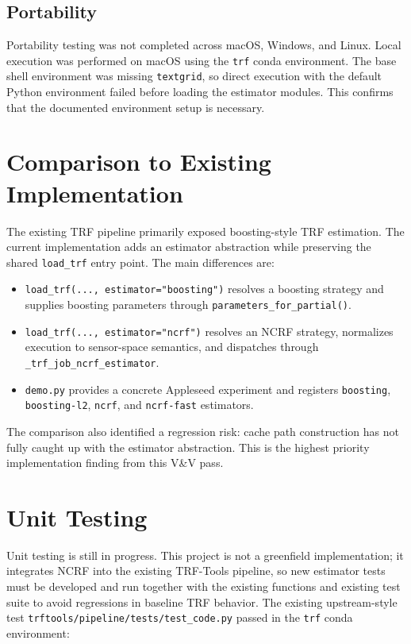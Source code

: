 \documentclass[12pt, titlepage]{article}
\begin{document}
\subsection{Portability}

Portability testing was not completed across macOS, Windows, and Linux. Local execution was performed on macOS using the \texttt{trf} conda environment. The base shell environment was missing \texttt{textgrid}, so direct execution with the default Python environment failed before loading the estimator modules. This confirms that the documented environment setup is necessary.

\section{Comparison to Existing Implementation}

The existing TRF pipeline primarily exposed boosting-style TRF estimation. The current implementation adds an estimator abstraction while preserving the shared \texttt{load\_trf} entry point. The main differences are:

\begin{itemize}
  \item \texttt{load\_trf(..., estimator="boosting")} resolves a boosting strategy and supplies boosting parameters through \texttt{parameters\_for\_partial()}.
  \item \texttt{load\_trf(..., estimator="ncrf")} resolves an NCRF strategy, normalizes execution to sensor-space semantics, and dispatches through \texttt{\_trf\_job\_ncrf\_estimator}.
  \item \texttt{demo.py} provides a concrete Appleseed experiment and registers \texttt{boosting}, \texttt{boosting-l2}, \texttt{ncrf}, and \texttt{ncrf-fast} estimators.
\end{itemize}

The comparison also identified a regression risk: cache path construction has not fully caught up with the estimator abstraction. This is the highest priority implementation finding from this V\&V pass.

\section{Unit Testing}

Unit testing is still in progress. This project is not a greenfield implementation; it integrates NCRF into the existing TRF-Tools pipeline, so new estimator tests must be developed and run together with the existing functions and existing test suite to avoid regressions in baseline TRF behavior. The existing upstream-style test \texttt{trftools/pipeline/tests/test\_code.py} passed in the \texttt{trf} conda environment:
\end{document}
